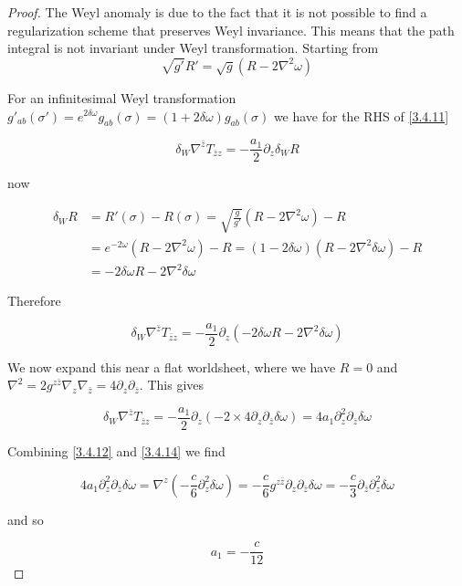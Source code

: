 \begin{tcolorbox}[breakable]
	\begin{proof}
		The Weyl anomaly is due to the fact that it is not possible to find a regularization scheme that preserves Weyl invariance. This means that the path integral is not invariant under Weyl transformation. Starting from
		\begin{equation}
			\sqrt{g'} R' = \sqrt{g}(R - 2\nabla^2\omega)
		\end{equation}
		
		For an infinitesimal Weyl transformation \( g'_{ab}(\sigma') = e^{2\delta\omega} g_{ab}(\sigma) = (1 + 2\delta\omega)g_{ab}(\sigma) \) we have for the RHS of \eqref{3.4.11}
		
		\begin{equation}
			\delta_W \nabla^{\bar{z}} T_{\bar{z} z} = -\frac{a_1}{2}\partial_z \delta_W R
		\end{equation}
		
		now
		
		\begin{equation}
			\begin{aligned}
				\delta_W R &= R'(\sigma) - R(\sigma) = \sqrt{\frac{g}{g'}}(R - 2\nabla^2\omega) - R \\
				&= e^{-2\omega}(R - 2\nabla^2\omega) - R = (1 - 2\delta\omega)(R - 2\nabla^2\delta\omega) - R \\
				&= -2\delta\omega R - 2\nabla^2\delta\omega
			\end{aligned}
		\end{equation}
		
		Therefore
		
		\begin{equation}
			\delta_W \nabla^{\bar{z}} T_{\bar{z} z} = -\frac{a_1}{2}\partial_z(-2\delta\omega R - 2\nabla^2\delta\omega)
		\end{equation}
		
		We now expand this near a flat worldsheet, where we have \( R = 0 \) and \( \nabla^2 = 2g^{z\bar{z}}\nabla_z\nabla_{\bar{z}} = 4\partial_z\partial_{\bar{z}} \). This gives
		
		\begin{equation}
			\delta_W \nabla^{\bar{z}} T_{\bar{z} z} = -\frac{a_1}{2}\partial_z(-2 \times 4\partial_z\partial_{\bar{z}}\delta\omega) = 4a_1\partial_z^2\partial_{\bar{z}}\delta\omega
		\end{equation}
		
		Combining \eqref{3.4.12} and \eqref{3.4.14} we find
		
		\begin{equation}
			4a_1 \partial_z^2 \partial_{\bar{z}} \delta \omega = \nabla^z \left( -\frac{c}{6} \partial_z^2 \delta \omega \right) = -\frac{c}{6} g^{z\bar{z}} \partial_z \partial_{\bar{z}} \delta \omega = -\frac{c}{3} \partial_{\bar{z}} \partial_z^2 \delta \omega
		\end{equation}
		
		and so
		
		\begin{equation}
			a_1 = -\frac{c}{12}
		\end{equation}
	\end{proof}
\end{tcolorbox}

